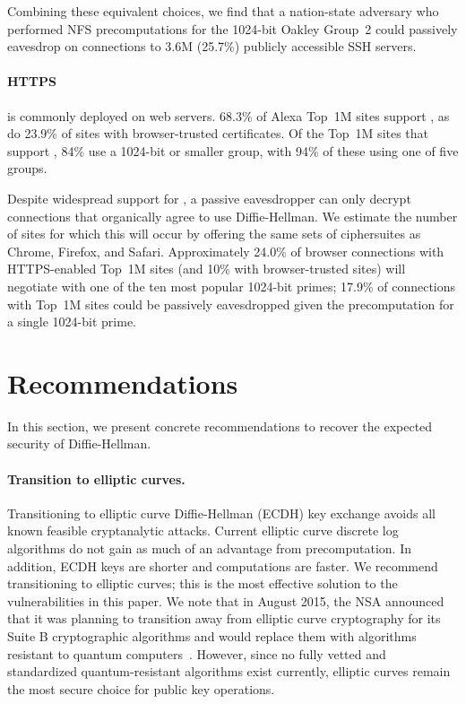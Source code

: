Combining these equivalent choices, we find that a nation-state adversary  who
performed NFS precomputations for the 1024-bit Oakley Group~2 could passively eavesdrop on connections to
3.6M (25.7\%) publicly accessible SSH servers.

\paragraph{HTTPS} \dhe is commonly deployed on web servers. 68.3\% of Alexa
Top~1M sites support \dhe, as do 23.9\% of sites with browser-trusted
certificates. Of the Top~1M sites that support \dhe, 84\% use a 1024-bit or smaller
group, with 94\% of these using one of five groups.

Despite widespread support for \dhe, a passive eavesdropper can only decrypt
connections that organically agree to use Diffie-Hellman. We estimate the
number of sites for which this will occur by offering the same sets of
ciphersuites as Chrome, Firefox, and Safari.
Approximately 24.0\% of browser connections with HTTPS-enabled Top~1M sites (and
10\% with browser-trusted sites) will negotiate \dhe with one of the ten most
popular 1024-bit primes; 17.9\% of connections with Top~1M sites could be
passively eavesdropped given the precomputation for a single 1024-bit prime.


\section{Recommendations}
\label{sec:lessons}

In this section, we present concrete recommendations
to recover the expected security of Diffie-Hellman.

\paragraph{Transition to elliptic curves.}
Transitioning to elliptic curve Diffie-Hellman (ECDH) key exchange avoids
all known feasible cryptanalytic attacks.  Current elliptic curve discrete log algorithms
do not gain as much of an advantage from precomputation.
In addition, ECDH keys are shorter and
computations are faster.
We recommend transitioning
to elliptic curves; this is the most effective solution to the
vulnerabilities in this paper.
We note that in August 2015, the NSA announced that it was planning to
transition away from elliptic curve cryptography for its Suite B cryptographic
algorithms and would replace them with algorithms resistant to quantum
computers~\cite{nsa-suiteb}.  However, since no fully vetted and standardized quantum-resistant
algorithms exist currently, elliptic curves remain the most secure choice for public key operations.

